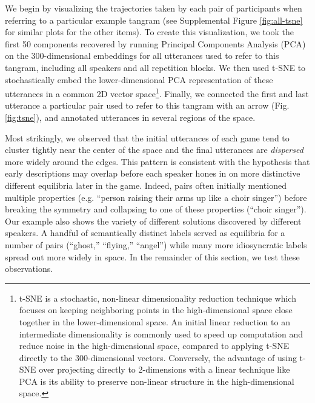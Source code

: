 \documentclass[alpha-refs]{wiley-article}
\begin{document}
We begin by visualizing the trajectories taken by each pair of participants when referring to a particular example tangram (see Supplemental Figure \ref{fig:all-tsne} for similar plots for the other items).
To create this visualization, we took the first 50 components recovered by running Principal Components Analysis (PCA) on the 300-dimensional embeddings for all utterances used to refer to this tangram, including all speakers and all repetition blocks.
We then used t-SNE \citep{maaten2008visualizing} to stochastically embed the lower-dimensional PCA representation of these utterances in a common 2D vector space\footnote{t-SNE is a stochastic, non-linear dimensionality reduction technique which focuses on keeping neighboring points in the high-dimensional space close together in the lower-dimensional space. An initial linear reduction to an intermediate dimensionality is commonly used to speed up computation and reduce noise in the high-dimensional space, compared to applying t-SNE directly to the 300-dimensional vectors. Conversely, the advantage of using t-SNE over projecting directly to 2-dimensions with a linear technique like PCA is its ability to preserve non-linear structure in the high-dimensional space.}.
Finally, we connected the first and last utterance a particular pair used to refer to this tangram with an arrow (Fig. \ref{fig:tsne}), and annotated utterances in several regions of the space.

Most strikingly, we observed that the initial utterances of each game tend to cluster tightly near the center of the space and the final utterances are \emph{dispersed} more widely around the edges.
This pattern is consistent with the hypothesis that early descriptions may overlap before each speaker hones in on more distinctive different equilibria later in the game.
Indeed, pairs often initially mentioned multiple properties (e.g. ``person raising their arms up like a choir singer'') before breaking the symmetry and collapsing to one of these properties (``choir singer'').
Our example also shows the variety of different solutions discovered by different speakers.
A handful of semantically distinct labels served as equilibria for a number of pairs (``ghost,'' ``flying,'' ``angel'') while many more idiosyncratic labels spread out more widely in space.
In the remainder of this section, we test these observations.
\end{document}
